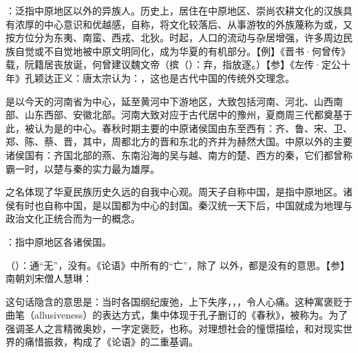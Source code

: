 {
\begin{lyitemize}
\item {}：泛指中原地区以外的异族人。历史上，居住在中原地区、崇尚农耕文化的汉族具有浓厚的中心意识和优越感，自称，将文化较落后、从事游牧的外族蔑称为或，又按方位分为东夷、南蛮、西戎、北狄。时起，人口的流动与杂居增强，许多周边民族自觉或不自觉地被中原文明同化，成为华夏的有机部分。【例】《晋书·何曾传》载，阮籍居丧放诞，何曾建议魏文帝（摈（）：弃，指放逐。）【参】《左传·定公十年》孔颖达正义：唐太宗认为：，这也是古代中国的传统外交理念。

是以今天的河南省为中心，延至黄河中下游地区，大致包括河南、河北、山西南部、山东西部、安徽北部。河南大致对应于古代居中的豫州，夏商周三代都奠基于此，被认为是的中心。春秋时期主要的中原诸侯国由东至西有：齐、鲁、宋、卫、郑、陈、蔡、晋，其中，周都北方的晋和东北的齐并为赫然大国。中原以外的主要诸侯国有：齐国北部的燕、东南沿海的吴与越、南方的楚、西方的秦，它们都曾称霸一时，以楚与秦的实力最为雄厚。 %

之名体现了华夏民族历史久远的自我中心观。周天子自称中国，是指中原地区。诸侯有时也自称中国，是以国都为中心的封国。秦汉统一天下后，中国就成为地理与政治文化正统合而为一的概念。

\item {}：指中原地区各诸侯国。
\item {}（）：通“无”，没有。《论语》中所有的“亡”，除了  以外，都是没有的意思。【参】南朝刘宋僧人慧琳：
\end{lyitemize}
这句话隐含的意思是：当时各国纲纪废弛，上下失序，，，令人心痛。这种寓褒贬于曲笔（allusiveness）的表达方式，集中体现于孔子删订的《春秋》，被称为。为了强调圣人之言精微奥妙，一字定褒贬，也称。对理想社会的憧憬描绘，和对现实世界的痛惜振救，构成了《论语》的二重基调。
}
{} %


